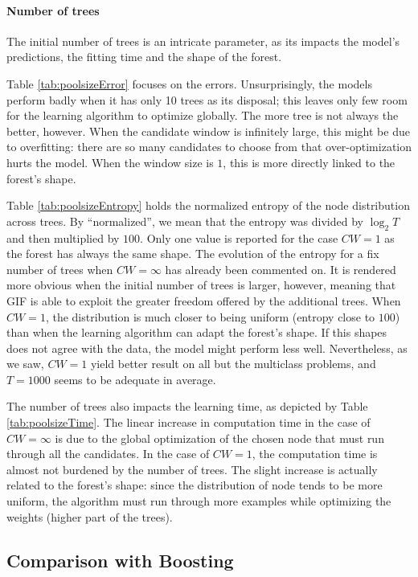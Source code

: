 \documentclass{article}
\begin{document}
\paragraph{Number of trees}
The initial number of trees is an intricate parameter, as its impacts the 
model's predictions, the fitting time and the shape of the forest.

Table \ref{tab:poolsizeError} focuses on the errors. Unsurprisingly, the models 
perform badly when it has only 10 trees as its disposal; this leaves only few 
room for the learning algorithm to optimize globally. The more tree is not 
always the better, however. When the candidate window is infinitely large, this 
might be due to overfitting: there are so many candidates to choose from that 
over-optimization hurts the model. When the window size is $1$, this is more 
directly linked to the forest's shape.

Table \ref{tab:poolsizeEntropy} holds the normalized entropy of the node 
distribution across trees. By ``normalized'', we mean that the entropy was 
divided by $\log_2 T$ and then multiplied by $100$.
Only one value is reported for the case $CW=1$ as the forest has always the 
same shape. The evolution of the entropy for a fix number of trees when 
$CW=\infty$ has already been commented on. It is rendered more obvious when the 
initial number of trees is larger, however, meaning that GIF is able to exploit 
the greater freedom offered by the additional trees. 
When $CW=1$, the distribution is much closer to being uniform (entropy 
close to $100$) than when the learning algorithm can adapt the forest's shape. 
If this shapes does not agree with the data, the model might perform less well. 
Nevertheless, as we saw, $CW=1$ yield better result on all but the multiclass 
problems, and $T=1000$ seems to be adequate in average. %

The number of trees also impacts the learning time, as depicted by Table 
\ref{tab:poolsizeTime}. The linear increase in computation time in the case of 
$CW=\infty$ is due to the global optimization of the chosen node that must run 
through all the candidates. In the case of $CW=1$, the computation time is 
almost not burdened by the number of trees. The slight increase is actually 
related to the forest's shape: since the distribution of node tends to be more 
uniform, the algorithm must run through more examples while optimizing the 
weights (higher part of the trees).


\subsection{Comparison with Boosting}
\label{subsec:boosting}
\end{document}

